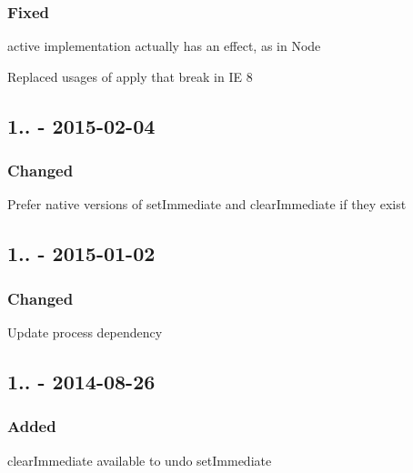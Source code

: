 \subsubsection*{Fixed}


\begin{DoxyItemize}
\item {\ttfamily active} implementation actually has an effect, as in Node
\item Replaced usages of {\ttfamily apply} that break in IE 8
\end{DoxyItemize}

\subsection*{1.. -\/ 2015-\/02-\/04}

\subsubsection*{Changed}


\begin{DoxyItemize}
\item Prefer native versions of {\ttfamily set\+Immediate} and {\ttfamily clear\+Immediate} if they exist
\end{DoxyItemize}

\subsection*{1.. -\/ 2015-\/01-\/02}

\subsubsection*{Changed}


\begin{DoxyItemize}
\item Update {\ttfamily process} dependency
\end{DoxyItemize}

\subsection*{1.. -\/ 2014-\/08-\/26}

\subsubsection*{Added}


\begin{DoxyItemize}
\item {\ttfamily clear\+Immediate} available to undo {\ttfamily set\+Immediate}
\end{DoxyItemize}

